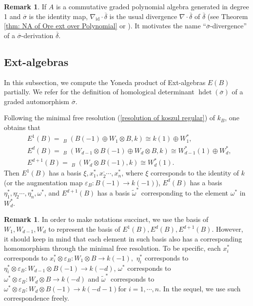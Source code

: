 \documentclass[a4paper,10pt]{amsart}
\theoremstyle{definition}
\newtheorem{remark}[theorem]{Remark}
\numberwithin{equation}{section}
\DeclareMathOperator{\uHom}{\underline{Hom}}
\DeclareMathOperator{\id}{id}
\DeclareMathOperator{\hdet}{hdet}
\begin{document}
\begin{remark}
If $A$ is a commutative graded polynomial algebra generated in degree 1 and $\overline{\sigma}$ is the identity map, $\nabla_{\id}\cdot\overline{\delta}$ is the usual divergence $\nabla\cdot\overline{\delta}$ of $\overline{\delta}$ (see Theorem \ref{thm: NA of Ore ext over Polynomial} or \cite[Thoerem 1.1(1)]{LM}). It motivates the name ``$\overline{\sigma}$-divergence'' of a $\overline{\sigma}$-derivation $\overline{\delta}$.
\end{remark}

\subsection{Ext-algebras}

In this subsection, we compute the Yoneda product of Ext-algebras $E(B)$ partially.  We refer \cite{JZ} for the definition of homological determinant $\hdet(\overline{\sigma})$ of a graded automorphism $\overline{\sigma}$.

Following the minimal free resolution (\ref{resolution of koszul regular}) of $k_B$, one obtains that
\begin{align*}
&E^{1}(B)=\uHom_{B}(B(-1)\oplus W_1\otimes B,k)\cong k(1)\oplus W_1^*,\\
&E^{d}(B)=\uHom_{B}(W_{d-1}\otimes B(-1)\oplus W_{d}\otimes B,k)\cong W_{d-1}^*(1)\oplus W_d^*,\\
&E^{d+1}(B)=\uHom_{B}(W_{d}\otimes B(-1),k)\cong W_{d}^*(1).
\end{align*}
Then $E^{1}(B)$ has a basis $\xi, x_1^*,x_2^,\cdots,x^*_n$, where $\xi$ corresponds to the identity of $k$ (or the augmentation map $\varepsilon_B:B(-1)\to k(-1)$), $E^{d}(B)$ has a basis $\eta_1^*,\eta_2^,\cdots,\eta^*_n,\omega^*$, and $E^{d+1}(B)$ has a basis $\widetilde{\omega}^*$ corresponding to  the element $\omega^*$ in $W_d^*$.
\begin{remark}
In order to make notations succinct, we  use the basis of $W_1, W_{d-1},W_d$ to represent the basis of $E^{1}(B),E^d(B),E^{d+1}(B)$. However, it should keep in mind that each element in such basis also has a corresponding homomorphism through the minimal free resolution. To be specific, each $x_i^*$ corresponds to $x_i^*\otimes \varepsilon_B:W_1\otimes B\to k(-1),$  $\eta_i^*$ corresponds to $\eta_i^*\otimes \varepsilon_B:W_{d-1}\otimes B(-1)\to k(-d)$,
$\omega^*$ corresponds to $\omega^*\otimes \varepsilon_B:W_{d}\otimes B\to k(-d)$ and $\widetilde{\omega}^*$ corresponds to $\omega^*\otimes \varepsilon_B:W_{d}\otimes B(-1)\to k(-d-1)$for $i=1,\cdots,n$. In the sequel, we use such correspondence freely.
\end{remark}
\end{document}
